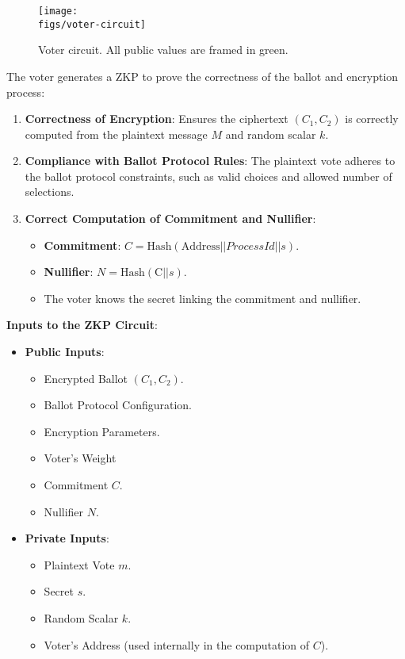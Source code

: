 \begin{figure}[h]
	\centerline{\texttt{[image: \\figs/voter-circuit]}}
	\caption{Voter circuit. All public values are framed in green.}
	\label{fig:circuit-voter}
\end{figure}

	The voter generates a ZKP to prove the correctness of the ballot and encryption process:

\begin{enumerate}
	\item \textbf{Correctness of Encryption}: Ensures the ciphertext $(C_1, C_2)$ is correctly computed from the plaintext message $M$ and random scalar $k$.
	\item \textbf{Compliance with Ballot Protocol Rules}: The plaintext vote adheres to the ballot protocol constraints, such as valid choices and allowed number of selections.
	\item \textbf{Correct Computation of Commitment and Nullifier}:
	\begin{itemize}
		\item \textbf{Commitment}: $C = \text{Hash} (\text{Address} || ProcessId || s).$
		\item \textbf{Nullifier}: $N = \text{Hash}(\text{C} || s)$.
		\item The voter knows the secret linking the commitment and nullifier.
	\end{itemize}
\end{enumerate}

\textbf{Inputs to the ZKP Circuit}:

\begin{itemize}
	\item \textbf{Public Inputs}:
	\begin{itemize}
		\item Encrypted Ballot $(C_1, C_2)$.
		\item Ballot Protocol Configuration.
		\item Encryption Parameters.
		\item Voter's Weight
		\item Commitment $C$.
		\item Nullifier $N$.
	\end{itemize}
	\item \textbf{Private Inputs}:
	\begin{itemize}
		\item Plaintext Vote $m$.
		\item Secret $s$.
		\item Random Scalar $k$.
		\item Voter's Address (used internally in the computation of $C$).
	\end{itemize}
\end{itemize}


